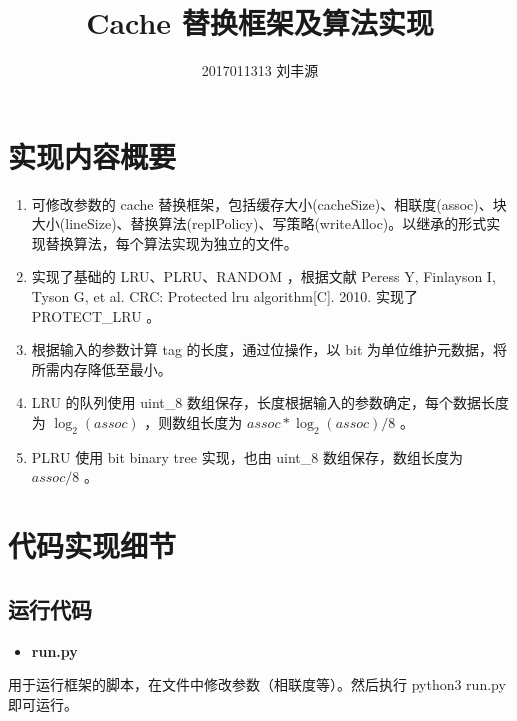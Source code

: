 \documentclass{article}
\title{Cache 替换框架及算法实现}
\author{2017011313 刘丰源}
\begin{document}
\normalsize
\maketitle
\tableofcontents
\newpage









\section{实现内容概要}




\begin{enumerate}
\item
可修改参数的 cache 替换框架，包括缓存大小(cacheSize)、相联度(assoc)、块大小(lineSize)、替换算法(replPolicy)、写策略(writeAlloc)。以继承的形式实现替换算法，每个算法实现为独立的文件。
\item
实现了基础的 LRU、PLRU、RANDOM ，根据文献 Peress Y, Finlayson I, Tyson G, et al. CRC: Protected lru algorithm{[}C{]}. 2010. 实现了 PROTECT\_LRU 。
\item
根据输入的参数计算 tag 的长度，通过位操作，以 bit 为单位维护元数据，将所需内存降低至最小。
\item
LRU 的队列使用 uint\_8 数组保存，长度根据输入的参数确定，每个数据长度为  $\log_2(assoc)$  ，则数组长度为  $assoc * \log_2(assoc) / 8$  。
\item
PLRU 使用 bit binary tree 实现，也由 uint\_8 数组保存，数组长度为  $assoc / 8$  。
\end{enumerate}



\section{代码实现细节}




\subsection{运行代码}




\begin{itemize}
\item
\textbf{run.py}
\end{itemize}



用于运行框架的脚本，在文件中修改参数（相联度等）。然后执行 python3 run.py 即可运行。
\end{document}
